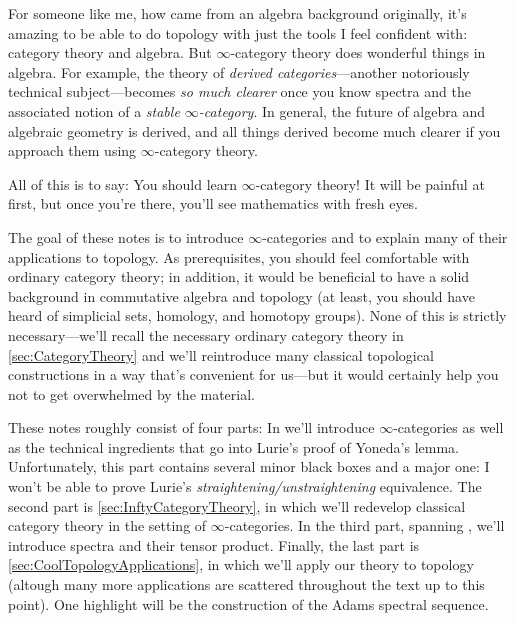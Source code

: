 \documentclass[DIV=12,numbers=enddot,leqno,bibliography=totoc]{scrartcl}
\begin{document}
\begin{numpar}
		For someone like me, how came from an algebra background originally, it's amazing to be able to do topology with just the tools I feel confident with: category theory and algebra. But $\infty$-category theory does wonderful things in algebra. For example, the theory of \emph{derived categories}---another notoriously technical subject---becomes \emph{so much clearer} once you know spectra and the associated notion of a \emph{stable $\infty$-category}. In general, the future of algebra and algebraic geometry is derived, and all things derived become much clearer if you approach them using $\infty$-category theory.
		
		All of this is to say: You should learn $\infty$-category theory! It will be painful at first, but once you're there, you'll see mathematics with fresh eyes.
		
		
	\end{numpar}
	\begin{numpar}
		The goal of these notes is to introduce $\infty$-categories and to explain many of their applications to topology. As prerequisites, you should feel comfortable with ordinary category theory; in addition, it would be beneficial to have a solid background in commutative algebra and topology (at least, you should have heard of simplicial sets, homology, and homotopy groups). None of this is strictly necessary---we'll recall the necessary ordinary category theory in \cref{sec:CategoryTheory} and we'll reintroduce many classical topological constructions in a way that's convenient for us---but it would certainly help you not to get overwhelmed by the material.
		
		These notes roughly consist of four parts: In  we'll introduce $\infty$-categories as well as the technical ingredients that go into Lurie's proof of Yoneda's lemma. Unfortunately, this part contains several minor black boxes and a major one: I won't be able to prove Lurie's \emph{straightening/unstraightening} equivalence. The second part is \cref{sec:InftyCategoryTheory}, in which we'll redevelop classical category theory in the setting of $\infty$-categories. In the third part, spanning , we'll introduce spectra and their tensor product. Finally, the last part is \cref{sec:CoolTopologyApplications}, in which we'll apply our theory to topology (altough many more applications are scattered throughout the text up to this point). One highlight will be the construction of the Adams spectral sequence.
	\end{numpar}
	
\end{document}
